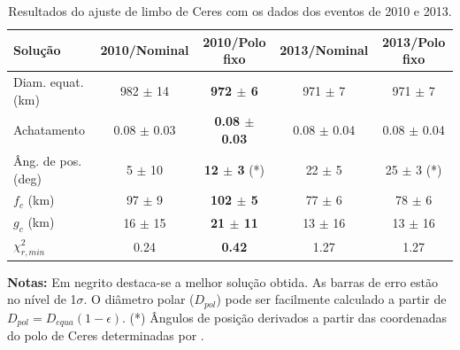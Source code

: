 \documentclass[12pt,a4paper]{report}
\newcommand{\degr}{\ensuremath{^{\circ}}}%
\begin{document}
\begin{table}[h]
 \begin{centering}
  \caption{Resultados do ajuste de limbo de Ceres com os dados dos eventos de 2010 e 2013.\label{Tab: resultados}}
  \begin{tabular}{@{}lcccc}
  \hline
     Solução & 2010/Nominal & \textbf{2010/Polo fixo} & 2013/Nominal & 2013/Polo fixo \\
\hline
Diam. equat.  (km) & 982 $\pm$ 14 & \textbf{972 $\pm$ 6}  & 971 $\pm$ 7  & 971 $\pm$ 7\\
Achatamento        & 0.08 $\pm$ 0.03 & \textbf{0.08 $\pm$ 0.03} & 0.08 $\pm$ 0.04 & 0.08 $\pm$ 0.04\\
Âng. de pos. (deg)   & 5 $\pm$ 10    & \textbf{12 $\pm$ 3} (*)& 22 $\pm$ 5    & 25 $\pm$ 3 (*)\\
$f_c$ (km)             & 97 $\pm$ 9   & \textbf{102 $\pm$ 5}   & 77 $\pm$ 6    & 78 $\pm$ 6\\
$g_c$ (km)             & 16 $\pm$ 15  & \textbf{21 $\pm$ 11}  & 13 $\pm$ 16   & 13 $\pm$ 16\\
$\chi^2_{r,min}$       & 0.24          &  \textbf{0.42}         & 1.27          & 1.27\\
\hline
\end{tabular}
\textbf{Notas:} Em negrito destaca-se a melhor solução obtida. As barras de erro estão no nível de 1$\sigma$. O diâmetro polar ($D_{pol}$) pode ser facilmente calculado a partir de $D_{pol}=D_{equa}(1 - \epsilon)$. (*) Ângulos de posição derivados a partir das coordenadas do polo de Ceres determinadas por \cite{Drummond2014}.
\end{centering}
\end{table}


\end{document}
